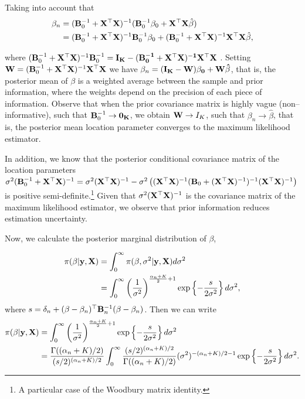 Taking into account that 
\begin{align*}\beta_n & = ({\bf{B}}_0^{-1} + {\bf{X}}^{\top}{\bf{X}})^{-1}({\bf{B}}_0^{-1}\beta_0 + {\bf{X}}^{\top}{\bf{X}}\hat{\beta})\\
	& = ({\bf{B}}_0^{-1} + {\bf{X}}^{\top}{\bf{X}})^{-1}{\bf{B}}_0^{-1}\beta_0 + ({\bf{B}}_0^{-1} + {\bf{X}}^{\top}{\bf{X}})^{-1} {\bf{X}}^{\top}{\bf{X}}\hat{\beta}, 
\end{align*}

where $({\bf{B}}_0^{-1} + {\bf{X}}^{\top}{\bf{X}})^{-1}{\bf{B}}_0^{-1}=\bf{I}_K-({\bf{B}}_0^{-1} + {\bf{X}}^{\top}{\bf{X}})^{-1}{\bf{X}}^{\top}{\bf{X}}$ \cite{Smith1973}. Setting ${\bf{W}}=({\bf{B}}_0^{-1} + {\bf{X}}^{\top}{\bf{X}})^{-1}{\bf{X}}^{\top}{\bf{X}}$ we have $\beta_n=(\bf{I}_K-{\bf{W}})\beta_0+{\bf{W}}\hat{\beta}$, that is, the posterior mean of $\beta$ is a weighted average between the sample and prior information, where the weights depend on the precision of each piece of information. Observe that when the prior covariance matrix is highly vague (non--informative), such that ${\bf{B}}_0^{-1}\rightarrow \bf{0}_K$, we obtain ${\bf{W}} \rightarrow I_K$, such that $\beta_n \rightarrow \hat{\beta}$, that is, the posterior mean location parameter converges to the maximum likelihood estimator.

In addition, we know that the posterior conditional covariance matrix of the location parameters $\sigma^2({\bf{B}}_0^{-1} + {\bf{X}}^{\top}{\bf{X}})^{-1}=\sigma^2({\bf{X}}^{\top}{\bf{X}})^{-1}-\sigma^2\left(({\bf{X}}^{\top}{\bf{X}})^{-1}({\bf{B}}_0 + ({\bf{X}}^{\top}{\bf{X}})^{-1})^{-1}({\bf{X}}^{\top}{\bf{X}})^{-1}\right)$ is positive semi-definite.\footnote{A particular case of the Woodbury matrix identity.} Given that $\sigma^2({\bf{X}}^{\top}{\bf{X}})^{-1}$ is the covariance matrix of the maximum likelihood estimator, we observe that prior information reduces estimation uncertainty.

Now, we calculate the posterior marginal distribution of $\beta$,

\begin{align*}
	\pi(\beta|{\bf{y}},{\bf{X}}) & = \int_0^{\infty} \pi(\beta, \sigma^2|{\bf{y}},{\bf{X}}) d\sigma^2 \\
	& = \int_0^{\infty} \left(\frac{1}{\sigma^2}\right)^{\frac{\alpha_n+K}{2} + 1} \exp \left\{-\frac{s}{2\sigma^2}\right\} d\sigma^2,
\end{align*}
where $s = \delta_n + (\beta - \beta_n)^{\top}{{\bf{B}}}_n^{-1}(\beta - \beta_n)$. Then we can write
\begin{align*}
	\pi(\beta|{\bf{y}},{\bf{X}}) & = \int_0^{\infty} \left(\frac{1}{\sigma^2}\right)^{\frac{\alpha_n+K}{2} + 1} \exp \left\{-\frac{s}{2\sigma^2}\right\} d\sigma^2 \\
	& = \frac{\Gamma((\alpha_n+K)/2)}{(s/2)^{(\alpha_n+K)/2}} \int_0^{\infty} \frac{(s/2)^{(\alpha_n+K)/2}}{\Gamma((\alpha_n+K)/2)} (\sigma^2)^{-(\alpha_n+K)/2 - 1} \exp \left\{-\frac{s}{2\sigma^2}\right\} d\sigma^2.
\end{align*}


